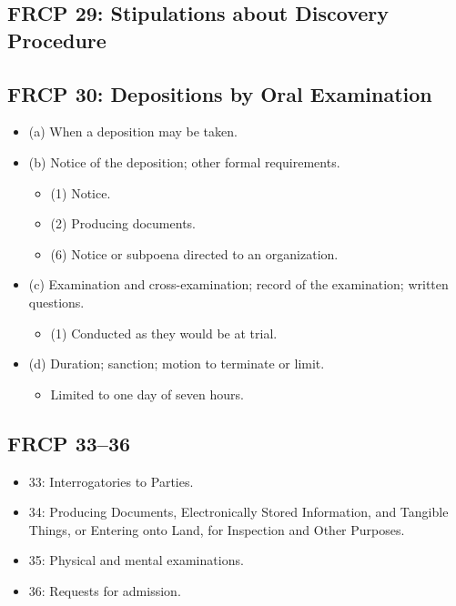 \subsection{FRCP 29: Stipulations about Discovery Procedure}

\subsection{FRCP 30: Depositions by Oral Examination}

\begin{itemize}
    \item (a) When a deposition may be taken.
    \item (b) Notice of the deposition; other formal requirements.
    \begin{itemize}
        \item (1) Notice.
        \item (2) Producing documents.
        \item (6) Notice or subpoena directed to an organization.
    \end{itemize}
    \item (c) Examination and cross-examination; record of the examination; written questions.
    \begin{itemize}
        \item (1) Conducted as they would be at trial.
    \end{itemize}
    \item (d) Duration; sanction; motion to terminate or limit.
    \begin{itemize}
        \item Limited to one day of seven hours.
    \end{itemize}
\end{itemize}

\subsection{FRCP 33--36}

\begin{itemize}
    \item 33: Interrogatories to Parties.
    \item 34: Producing Documents, Electronically Stored Information, and Tangible Things, or Entering onto Land, for Inspection and Other Purposes.
    \item 35: Physical and mental examinations.
    \item 36: Requests for admission.
\end{itemize}

